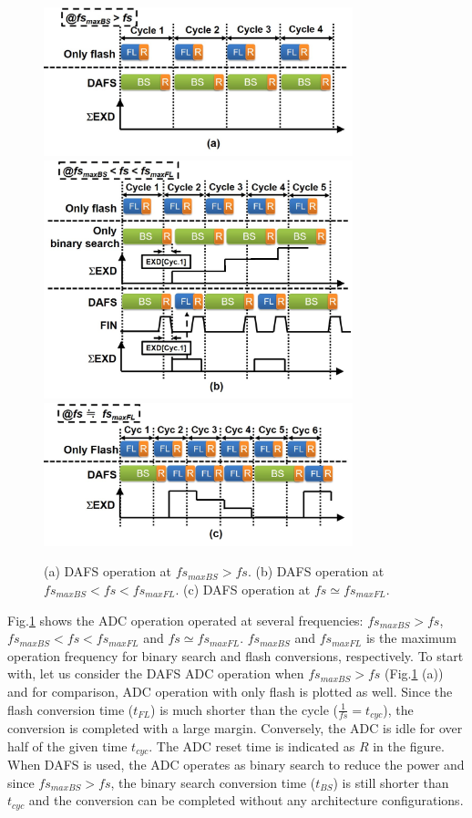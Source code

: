 \begin{figure}
\centering
  \includegraphics[width=0.8\textwidth]{figure/chap3/fig5a.jpg}
  \includegraphics[width=0.8\textwidth]{figure/chap3/fig5b.jpg}
  \includegraphics[width=0.8\textwidth]{figure/chap3/fig5c.jpg}
  \caption{(a) DAFS operation at $fs_{maxBS} > fs$. (b) DAFS operation at
$fs_{maxBS} < fs < fs_{maxFL}$. (c) DAFS operation at $fs \simeq fs_{maxFL}$.}
  \label{fig-3-5}
\end{figure}

Fig.\ref{fig-3-5} shows the ADC operation operated at several frequencies: $fs_{maxBS} > fs$, $fs_{maxBS} < fs < fs_{maxFL}$ and $fs \simeq fs_{maxFL}$. $fs_{maxBS}$ and $fs_{maxFL}$ is the maximum operation frequency for binary search and flash conversions, respectively. To start with, let us consider the DAFS ADC operation when $fs_{maxBS} > fs$ (Fig.\ref{fig-3-5} (a)) and for comparison, ADC operation with only flash is plotted as well. Since the flash conversion time ($t_{FL}$) is much shorter than the cycle ($\frac{1}{fs} = t_{cyc}$), the conversion is completed with a large margin. Conversely, the ADC is idle for over half of the given time $t_{cyc}$. The ADC reset time is indicated as $R$ in the figure. When DAFS is used, the ADC operates as binary search to reduce the power and since $fs_{maxBS} > fs$, the binary search conversion time ($t_{BS}$) is still shorter than $t_{cyc}$ and the conversion can be completed without any architecture configurations. 

